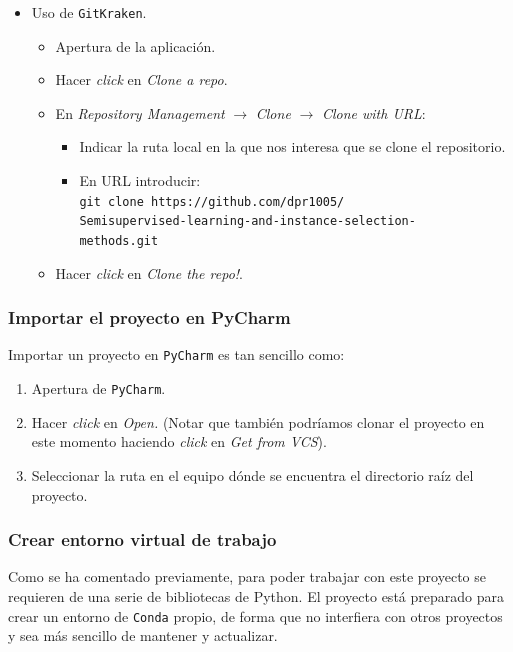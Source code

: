 \begin{itemize}
\item Uso de \texttt{GitKraken}.
\begin{itemize}
\tightlist
\item Apertura de la aplicación.
\item Hacer \textit{click} en \textit{Clone a repo}.
\item En \textit{Repository Management} $\rightarrow$ \textit{Clone} $\rightarrow$ \textit{Clone with URL}: 
\begin{itemize}
\item Indicar la ruta local en la que nos interesa que se clone el repositorio.
\item En URL introducir:\\
\texttt{git clone https://github.com/dpr1005/\\Semisupervised-learning-and-instance-selection-\\methods.git}
\end{itemize}
\item Hacer \textit{click} en \textit{Clone the repo!}.
\end{itemize}
\end{itemize}

\subsubsection{Importar el proyecto en PyCharm}
Importar un proyecto en \texttt{PyCharm} es tan sencillo como:
\begin{enumerate}
\tightlist
\item Apertura de \texttt{PyCharm}.
\item Hacer \textit{click} en \textit{Open.} (Notar que también podríamos clonar el proyecto en este momento haciendo \textit{click} en \textit{Get from VCS}).
\item Seleccionar la ruta en el equipo dónde se encuentra el directorio raíz del proyecto.
\end{enumerate}

\subsubsection{Crear entorno virtual de trabajo}
Como se ha comentado previamente, para poder trabajar con este proyecto se requieren de una serie de bibliotecas de Python. El proyecto está preparado para crear un entorno de \texttt{Conda} propio, de forma que no interfiera con otros proyectos y sea más sencillo de mantener y actualizar.

